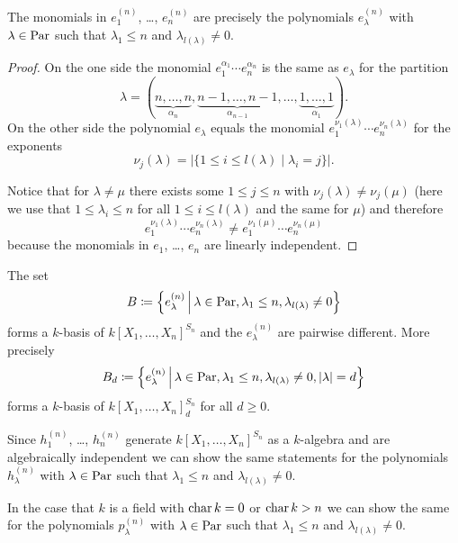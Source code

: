 \begin{prop}
 The monomials in $e^{(n)}_1$, \dots, $e^{(n)}_n$ are precisely the polynomials $e^{(n)}_\lambda$ with $\lambda \in \operatorname{Par}$ such that $\lambda_1 \leq n$ and $\lambda_{l(\lambda)} \neq 0$.
\end{prop}
\begin{proof}
 On the one side the monomial $e_1^{\alpha_1} \dotsm e_n^{\alpha_n}$ is the same as $e_\lambda$ for the partition
 \[
  \lambda = (\underbrace{n, \dotsc, n}_{\alpha_n}, \underbrace{n-1, \dotsc, n-1}_{\alpha_{n-1}}, \dotsc, \underbrace{1, \dotsc, 1}_{\alpha_1}).
 \]
 On the other side the polynomial $e_\lambda$ equals the monomial $e_1^{\nu_1(\lambda)} \dotsm e_n^{\nu_n(\lambda)}$ for the exponents
 \[
  \nu_j(\lambda) = |\{1 \leq i \leq l(\lambda) \mid \lambda_i = j\}|.
 \]
 
 Notice that for $\lambda \neq \mu$ there exists some $1 \leq j \leq n$ with $\nu_j(\lambda) \neq \nu_j(\mu)$ (here we use that $1 \leq \lambda_i \leq n$ for all $1 \leq i \leq l(\lambda)$ and the same for $\mu$) and therefore
 \[
  e_1^{\nu_1(\lambda)} \dotsm e_n^{\nu_n(\lambda)} \neq e_1^{\nu_1(\mu)} \dotsm e_n^{\nu_n(\mu)}
 \]
 because the monomials in $e_1$, \dots, $e_n$ are linearly independent.
\end{proof}


\begin{cor}
 The set
 \[
  B \coloneqq \left\{ e^{(n)}_\lambda \,\middle|\, \lambda \in \operatorname{Par}, \lambda_1 \leq n, \lambda_{l(\lambda)} \neq 0 \right\}
 \]
 forms a $k$-basis of $k[X_1, \dotsc, X_n]^{S_n}$ and the $e^{(n)}_\lambda$ are pairwise different. More precisely
 \[
  B_d \coloneqq \left\{ e^{(n)}_\lambda \,\middle|\, \lambda \in \operatorname{Par}, \lambda_1 \leq n, \lambda_{l(\lambda)} \neq 0, |\lambda| = d \right\}
 \]
 forms a $k$-basis of $k[X_1, \dotsc, X_n]^{S_n}_d$ for all $d \geq 0$.
\end{cor}


\begin{rem}
 Since $h^{(n)}_1$, \dots, $h^{(n)}_n$ generate $k[X_1, \dotsc, X_n]^{S_n}$ as a $k$-algebra and are algebraically independent we can show the same statements for the polynomials $h^{(n)}_\lambda$ with $\lambda \in \operatorname{Par}$ such that $\lambda_1 \leq n$ and $\lambda_{l(\lambda)} \neq 0$.
 
 In the case that $k$ is a field with $\operatorname{char} k = 0$ or $\operatorname{char} k > n$ we can show the same for the polynomials $p^{(n)}_\lambda$ with $\lambda \in \operatorname{Par}$ such that $\lambda_1 \leq n$ and $\lambda_{l(\lambda)} \neq 0$.
\end{rem}


